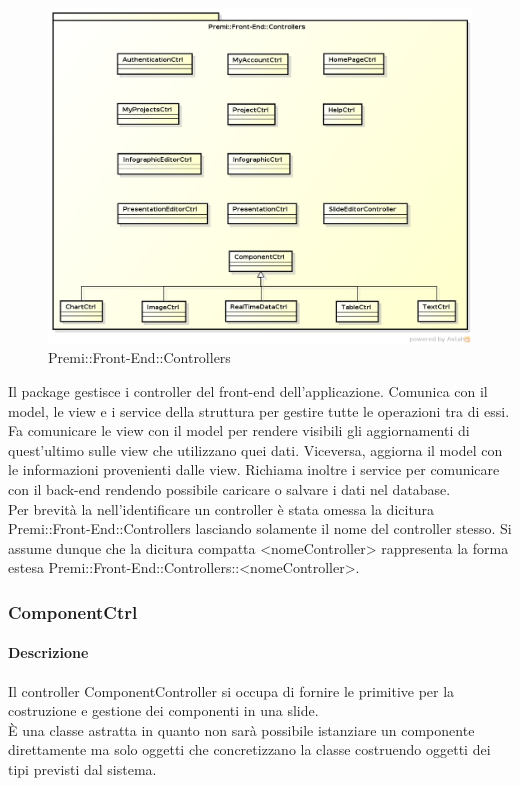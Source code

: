 \begin{figure}[h]
	\centering
	\includegraphics[width=1.0\linewidth]{img/premi_front_end_controllers}
	\caption[Premi::Front-End::Controllers]{Premi::Front-End::Controllers}
\end{figure}
Il package gestisce i controller del front-end dell'applicazione. Comunica con il model, le view e i service della struttura per gestire tutte le operazioni tra di essi. Fa comunicare le view con il model per rendere visibili gli aggiornamenti di quest'ultimo sulle view che utilizzano quei dati. Viceversa, aggiorna il model con le informazioni provenienti dalle view. Richiama inoltre i service per comunicare con il back-end rendendo possibile caricare o salvare i dati nel database.\\
Per brevità la nell'identificare un controller è stata omessa la dicitura Premi::Front-End::Controllers lasciando solamente il nome del controller stesso. Si assume dunque che la dicitura compatta <nomeController> rappresenta la forma estesa Premi::Front-End::Controllers::<nomeController>.

\newpage

\subsubsection{ComponentCtrl}
      \paragraph{Descrizione}
	Il controller ComponentController si occupa di fornire le primitive per la costruzione e gestione dei componenti in una slide.\\
	È una classe astratta in quanto non sarà possibile istanziare un componente direttamente ma solo oggetti che concretizzano la classe costruendo oggetti dei tipi previsti dal sistema.
		
